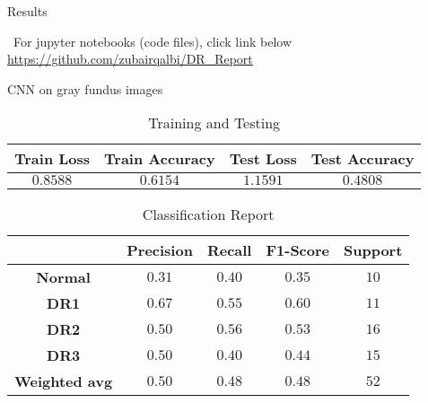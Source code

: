 \documentclass{beamer}
\begin{document}
\begin{frame}{Results}
\begin{center}
\begin{block}{\, For jupyter notebooks (code files), click link below}
\url{https://github.com/zubairqalbi/DR_Report}
\end{block}
\end{center}
\end{frame}

\begin{frame}[t]{CNN on gray fundus images}
\begin{table}
\caption{Training and Testing}
\begin{tabular}{c c c c}
\hline
\textbf{Train Loss} & \textbf{Train Accuracy} & \textbf{Test Loss} & \textbf{Test Accuracy}\\
\hline
$0.8588$ & $0.6154$ & $1.1591$ & $0.4808$\\
\hline
\end{tabular}
\end{table}

\begin{table}[t]
\caption{Classification Report}
\begin{tabular}{c c c c c}
\hline
\textbf{} & \textbf{Precision} & \textbf{Recall} & \textbf{F1-Score} & \textbf{Support} \\
\hline
\textbf{Normal} & $0.31$ & $0.40$ & $0.35$ & $10$\\
\textbf{DR1} & $0.67$ & $0.55$ & $0.60$ & $11$\\
\textbf{DR2} & $0.50$ & $0.56$ & $0.53$ & $16$\\
\textbf{DR3} & $0.50$ & $0.40$ & $0.44$ & $15$\\
\textbf{Weighted avg} & $0.50$ & $0.48$ & $0.48$ & $52$\\
\hline
\end{tabular}
\end{table}

\end{frame}
\end{document}
